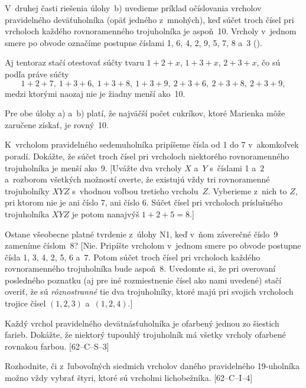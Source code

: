 {V~druhej časti riešenia úlohy~b) uvedieme príklad očíslovania vrcholov pravidelného deväťuholníka (opäť jedného
z~mnohých), keď súčet troch čísel pri vrcholoch každého rovnoramenného
trojuholníka je aspoň~10. Vrcholy
v~jednom smere po obvode označíme postupne číslami
1, 6, 4, 2, 9, 5, 7, 8 a~3 (\obr).
%

Aj tentoraz stačí otestovať súčty tvaru $1+2+x$, $1+3+x$, $2+3+x$,
čo sú podľa  práve súčty
$$
1+2+7,\ 1+3+6,\ 1+3+8,\ 1+3+9,\ 2+3+6,\ 2+3+8,\ 2+3+9,
$$
medzi ktorými naozaj nie je žiadny menší ako~10.

\odpoved
Pre obe úlohy a) a~b) platí, že najväčší počet
cukríkov, ktoré Marienka môže zaručene získať, je rovný~10.


K~vrcholom pravidelného sedemuholníka pripíšeme
čísla od 1 do 7 v~akomkoľvek poradí.
Dokážte, že súčet troch čísel pri vrcholoch
niektorého rovnoramenného trojuholníka je menší ako~9. [Uvážte dva
vrcholy $X$ a~$Y$ s~číslami 1 a~2 a~rozborom všetkých možností overte,
že existujú vždy tri rovnoramenné trojuholníky $XYZ$ s~vhodnou voľbou
tretieho vrcholu~$Z$. Vyberieme z~nich to $Z$, pri ktorom nie je
ani číslo 7, ani číslo 6. Súčet čísel pri vrcholoch príslušného
trojuholníka $XYZ$ je potom nanajvýš $1+2+5=8$.]

Ostane všeobecne platné tvrdenie z~úlohy N1, keď v~ňom
záverečné číslo~9 zameníme číslom~8? [Nie. Pripíšte vrcholom
v~jednom smere po obvode postupne čísla 1, 3, 4, 2, 5, 6 a~7. Potom
súčet troch čísel pri vrcholoch každého rovnoramenného trojuholníka bude
aspoň~8. Uvedomte si, že pri overovaní posledného poznatku
(aj pre iné rozmiestnenie čísel ako nami uvedené) stačí
overiť, že sú {\it rôznostranné\/} tie dva trojuholníky,
ktoré majú pri svojich vrcholoch trojice čísel $(1,2,3)$ a~$(1,2,4)$.]

\D
Každý vrchol pravidelného devätnásťuholníka je ofarbený jednou
zo šiestich farieb. Dokážte, že niektorý tupouhlý trojuholník má všetky vrcholy ofarbené rovnakou farbou.
[62--C--S--3]

Rozhodnite, či z~ľubovoľných siedmich vrcholov daného pravidelného
19-uholníka možno vždy vybrať štyri, ktoré sú vrcholmi lichobežníka. [62--C--I--4]
}

